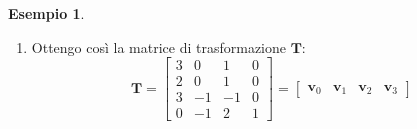 \documentclass[a4paper]{article}
\renewcommand{\vec}{\bm}
\theoremstyle{definition}
\newtheorem{exmp}{Esempio}[section]
\begin{document}
\begin{exmp}
\begin{enumerate}
					\item Ottengo così la matrice di trasformazione $ \vec{T} $:
					\[
					    \vec{T}=
						\begin{bmatrix}
							3 & 0 & 1 & 0 \\
							2 & 0 & 1 & 0 \\
							3 & -1 & -1 & 0 \\
							0 & -1 & 2 & 1
						\end{bmatrix}
						=
						\begin{bmatrix}
							\vec{v}_0 & \vec{v}_1 & \vec{v}_2 & \vec{v}_3 
						\end{bmatrix}
					\]
				\end{enumerate}
				
				
			\end{exmp}
\end{document}
